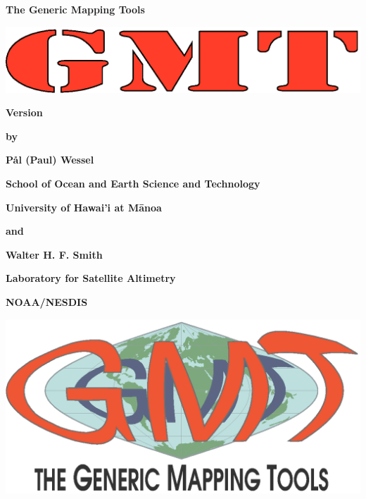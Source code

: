 %
%

\thispagestyle{empty}

\begin{center}
\huge
\textbf{The Generic Mapping Tools}\par 
\vspace{0.5\baselineskip}

\includegraphics{fig/GMT_covertext} 

\Huge
\textbf{Version \GMTDOCVERSION}\par 
\vspace{0.25\baselineskip}

\huge
\textbf{\GMTTITLE}\par 

\large
\vspace{0.75\baselineskip}
\textbf{by}\par 
\vspace{0.75\baselineskip}

\huge
\textbf{P\aa l (Paul) Wessel}\par 
\vspace{0.5\baselineskip}

\Large
\textbf{School of Ocean and Earth Science and Technology}\par 
\textbf{University of Hawai'i at M\={a}noa}\par 

\large
\vspace{0.75\baselineskip}
\textbf{and}\par 
\vspace{0.75\baselineskip}

\huge
\textbf{Walter H. F. Smith}\par 
\vspace{0.5\baselineskip}

\Large
\textbf{Laboratory for Satellite Altimetry}\par 
\textbf{NOAA/NESDIS}\par 
\vspace{0.5\baselineskip}

\large
\textbf{\GMTDOCDATE}\par 
\vspace{\baselineskip}

\includegraphics{scripts/GMT_coverlogo}
\end{center}
